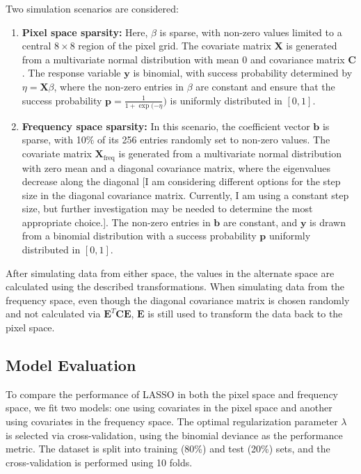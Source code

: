 \documentclass[12pt]{article}
\begin{document}
Two simulation scenarios are considered:
\begin{enumerate}
  \item \textbf{Pixel space sparsity:} Here, \( \beta \) is sparse, with non-zero values limited to a central \( 8 \times 8 \) region of the pixel grid. The covariate matrix \( \mathbf{X} \) is generated from a multivariate normal distribution with mean 0 and covariance matrix \( \mathbf{C} \). The response variable \( \mathbf{y} \) is binomial, with success probability determined by \( \eta = \mathbf{X} \beta \), where the non-zero entries in \( \beta \) are constant and ensure that the success probability \( \mathbf{p} = \frac{1}{1 + \exp(-\eta}) \) is uniformly distributed in \( [0, 1] \).
  
  \item \textbf{Frequency space sparsity:} In this scenario, the coefficient vector \( \mathbf{b} \) is sparse, with 10\% of its 256 entries randomly set to non-zero values. The covariate matrix \( \mathbf{X}_{\mathrm{freq}} \) is generated from a multivariate normal distribution with zero mean and a diagonal covariance matrix, where the eigenvalues decrease along the diagonal [I am considering different options for the step size in the diagonal covariance matrix. Currently, I am using a constant step size, but further investigation may be needed to determine the most appropriate choice.]. The non-zero entries in \( \mathbf{b} \) are constant, and \( \mathbf{y} \) is drawn from a binomial distribution with a success probability \( \mathbf{p} \) uniformly distributed in \( [0, 1] \).

\end{enumerate}

After simulating data from either space, the values in the alternate space are calculated using the described transformations. When simulating data from the frequency space, even though the diagonal covariance matrix is chosen randomly and not calculated via \( \mathbf{E}^T \mathbf{C} \mathbf{E} \), \( \mathbf{E} \) is still used to transform the data back to the pixel space.

\subsection*{Model Evaluation}

To compare the performance of LASSO in both the pixel space and frequency space, we fit two models: one using covariates in the pixel space and another using covariates in the frequency space. The optimal regularization parameter \( \lambda \) is selected via cross-validation, using the binomial deviance as the performance metric. The dataset is split into training (80\%) and test (20\%) sets, and the cross-validation is performed using 10 folds.
\end{document}
